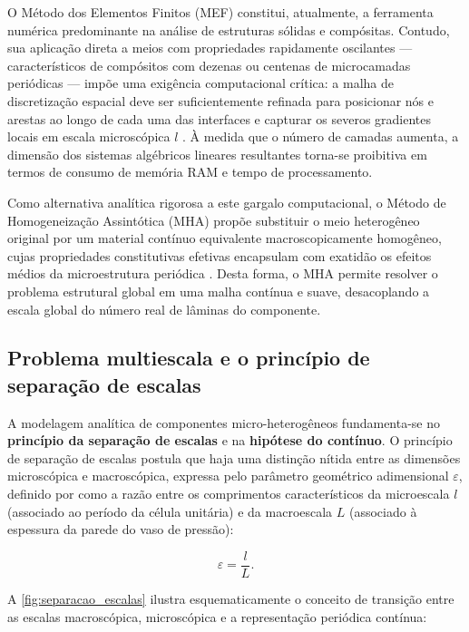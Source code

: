 O Método dos Elementos Finitos (MEF) constitui, atualmente, a ferramenta numérica predominante na análise de estruturas sólidas e compósitas. Contudo, sua aplicação direta a meios com propriedades rapidamente oscilantes — característicos de compósitos com dezenas ou centenas de microcamadas periódicas — impõe uma exigência computacional crítica: a malha de discretização espacial deve ser suficientemente refinada para posicionar nós e arestas ao longo de cada uma das interfaces e capturar os severos gradientes locais em escala microscópica $l$ \cite{Guinovart2024}. À medida que o número de camadas aumenta, a dimensão dos sistemas algébricos lineares resultantes torna-se proibitiva em termos de consumo de memória RAM e tempo de processamento.

Como alternativa analítica rigorosa a este gargalo computacional, o Método de Homogeneização Assintótica (MHA) propõe substituir o meio heterogêneo original por um material contínuo equivalente macroscopicamente homogêneo, cujas propriedades constitutivas efetivas encapsulam com exatidão os efeitos médios da microestrutura periódica \cite{bakhvalov1989}. Desta forma, o MHA permite resolver o problema estrutural global em uma malha contínua e suave, desacoplando a escala global do número real de lâminas do componente.

\subsection{Problema multiescala e o princípio de separação de escalas}

A modelagem analítica de componentes micro-heterogêneos fundamenta-se no \textbf{princípio da separação de escalas} e na \textbf{hipótese do contínuo}. O princípio de separação de escalas postula que haja uma distinção nítida entre as dimensões microscópica e macroscópica, expressa pelo parâmetro geométrico adimensional $\varepsilon$, definido por \cite{bakhvalov1989} como a razão entre os comprimentos característicos da microescala $l$ (associado ao período da célula unitária) e da macroescala $L$ (associado à espessura da parede do vaso de pressão):

\begin{equation}
  \varepsilon = \frac{l}{L}.
  \label{eq:epsilon_definicao}
\end{equation}

A \autoref{fig:separacao_escalas} ilustra esquematicamente o conceito de transição entre as escalas macroscópica, microscópica e a representação periódica contínua:


